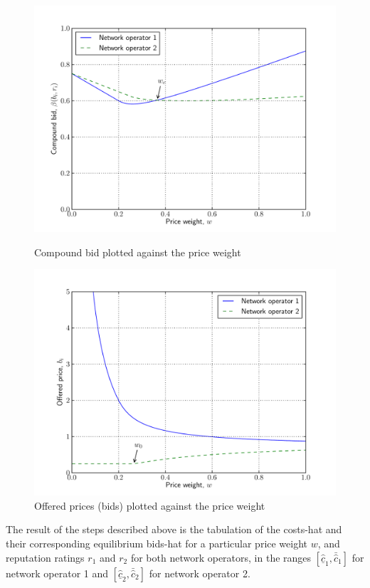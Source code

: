 \begin{figure}[p!]
  \includegraphics[width=\figsize]{Indirect/Figures/bids_restricted}
  \caption{Compound bid plotted against the price weight}
  \label{fig:bids_restricted_indirect}
  \vspace{10mm}
  \includegraphics[width=\figsize]{Indirect/Figures/prices_restricted}
  \caption{Offered prices (bids) plotted against the price weight}
  \label{fig:prices_restricted_indirect}
\end{figure}

The result of the steps described above is the tabulation of the costs-hat and their corresponding equilibrium bids-hat for a particular price weight $w$, and reputation ratings $r_1$ and $r_2$ for both network operators, in the ranges $[\underline{\hat{c}}_1, \bar{\hat{c}}_1]$ for network operator 1 and $[\underline{\hat{c}}_2, \bar{\hat{c}}_2]$ for network operator 2.

